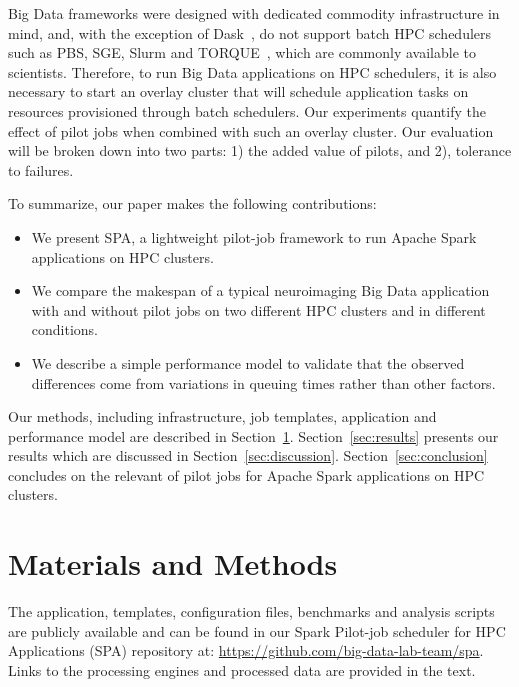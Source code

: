 \documentclass{IEEEtran}
\begin{document}
Big Data frameworks were designed with dedicated commodity infrastructure
in mind, and, with the exception of Dask~\cite{rocklin2015dask}, do not support batch
HPC schedulers such as PBS, SGE, Slurm and TORQUE~\cite{schedulers}, which
are commonly available to scientists. Therefore, to run Big Data
applications on HPC schedulers, it is also necessary to start an overlay
cluster that will schedule application tasks on resources provisioned
through batch schedulers. Our experiments quantify the effect of pilot jobs
when combined with such an overlay cluster. Our evaluation will be broken
down into two parts:
1) the added value of pilots, and 2), tolerance to failures.

To summarize, our paper
makes the following contributions:
\begin{itemize}
\item We present SPA, a lightweight pilot-job framework to run Apache Spark
applications on HPC clusters.
\item We compare the makespan of a typical neuroimaging Big Data
application with and without pilot jobs on two different HPC clusters and
in different conditions.
\item We describe a simple performance model to validate that the observed
differences come from variations in queuing times rather than other
factors.
\end{itemize}
Our methods, including infrastructure, job templates, application and
performance model are described in Section~\ref{sec:methods}.
Section~\ref{sec:results} presents our results which are discussed in
Section~\ref{sec:discussion}. Section~\ref{sec:conclusion} concludes on the 
relevant of pilot jobs for Apache Spark applications on HPC clusters.

\section{Materials and Methods}\label{sec:methods}

    The application, templates, configuration files, benchmarks and
    analysis scripts are publicly available and can be found in our Spark
    Pilot-job scheduler for HPC Applications (SPA) repository at:
    \href{https://github.com/big-data-lab-team/spa}{https://github.com/big-data-lab-team/spa}.
    Links to the processing engines and processed data are provided in the
    text.
    
\end{document}
